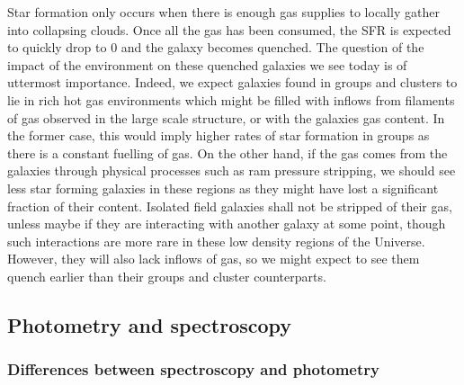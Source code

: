 Star formation only occurs when there is enough gas supplies to locally gather into collapsing clouds. Once all the gas has been consumed, the SFR is expected to quickly drop to $0$ and the galaxy becomes quenched. The question of the impact of the environment on these quenched galaxies we see today is of uttermost importance. Indeed, we expect galaxies found in groups and clusters to lie in rich hot gas environments which might be filled with inflows from filaments of gas observed in the large scale structure, or with the galaxies gas content. In the former case, this would imply higher rates of star formation in groups as there is a constant fuelling of gas. On the other hand, if the gas comes from the galaxies through physical processes such as ram pressure stripping, we should see less star forming galaxies in these regions as they might have lost a significant fraction of their content. Isolated field galaxies shall not be stripped of their gas, unless maybe if they are interacting with another galaxy at some point, though such interactions are more rare in these low density regions of the Universe. However, they will also lack inflows of gas, so we might expect to see them quench earlier than their groups and cluster counterparts. 




\subsection{Photometry and spectroscopy}
\label{subsec:diffPhotSpec}

\subsubsection{Differences between spectroscopy and photometry}
\label{subsubsec:photo_data}

